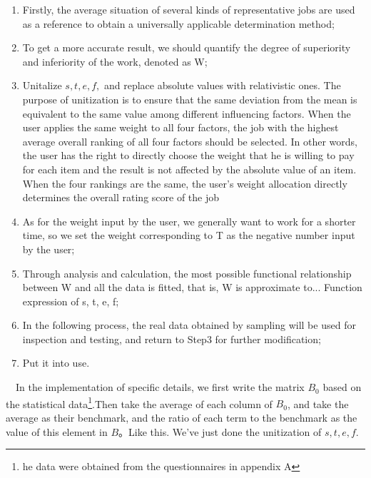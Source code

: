 \documentclass[12pt]{article}
\begin{document}
\begin{enumerate}
    \item Firstly, the average situation of several kinds of representative jobs are used as a reference to obtain a universally applicable determination method;
    \item To get a more accurate result, we should quantify the degree of superiority and inferiority of the work, denoted as W;%
    \item Unitalize $s, t, e, f,$ and replace absolute values with relativistic ones. The purpose of unitization is to ensure that the same deviation from the mean is equivalent to the same value among different influencing factors. When the user applies the same weight to all four factors, the job with the highest average overall ranking of all four factors should be selected. In other words, the user has the right to directly choose the weight that he is willing to pay for each item and the result is not affected by the absolute value of an item. When the four rankings are the same, the user's weight allocation directly determines the overall rating score of the job%
    \item As for the weight input by the user, we generally want to work for a shorter time, so we set the weight corresponding to T as the negative number input by the user;%
    \item Through analysis and calculation, the most possible functional relationship between W and all the data is fitted, that is, W is approximate to... Function expression of s, t, e, f;%
    \item In the following process, the real data obtained by sampling will be used for inspection and testing, and return to Step3 for further modification;%
    \item Put it into use.%
\end{enumerate}
%
~~In the implementation of specific details, we first write the matrix $B_{0}$ based on the statistical data\footnote[2]{he data were obtained from the questionnaires in appendix A}.Then take the average of each column of $B_{0}$, and take the average as their benchmark, and the ratio of each term to the benchmark as the value of this element in $B$。Like this. We've just done the unitization of $s, t, e, f$. 
\end{document}
